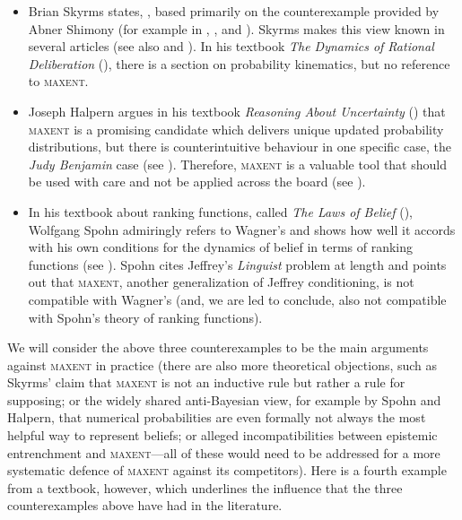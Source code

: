 \documentclass[11pt]{article}
\begin{document}
\begin{itemize}
\item Brian Skyrms states,  , based
  primarily on the counterexample provided by Abner Shimony (for
  example in ,
  , and ). Skyrms
  makes this view known in several articles (see also
   and ). In his
  textbook \emph{The Dynamics of Rational Deliberation}
  (), there is a section on probability
  kinematics, but no reference to \textsc{maxent}.
\item Joseph Halpern argues in his textbook \emph{Reasoning About
    Uncertainty} () that \textsc{maxent} is a
  promising candidate which delivers unique updated probability
  distributions, but there is counterintuitive behaviour in one
  specific case, the \emph{Judy Benjamin} case (see ). Therefore, \textsc{maxent} is a valuable tool that should
  be used with care and not be applied across the board (see
  ).
\item In his textbook about ranking functions, called \emph{The Laws
    of Belief} (), Wolfgang Spohn admiringly
  refers to Wagner's   and shows how well it
  accords with his own conditions for the dynamics of belief in terms
  of ranking functions (see ). Spohn cites
  Jeffrey's \emph{Linguist} problem at length and points out that
  \textsc{maxent}, another generalization of Jeffrey conditioning, is
  not compatible with Wagner's (and, we are led to conclude, also not
  compatible with Spohn's theory of ranking functions).
\end{itemize}

We will consider the above three counterexamples to be the main
arguments against \textsc{maxent} in practice (there are also more
theoretical objections, such as Skyrms' claim that \textsc{maxent} is
not an inductive rule but rather a rule for supposing; or the widely
shared anti-Bayesian view, for example by Spohn and Halpern, that
numerical probabilities are even formally not always the most helpful
way to represent beliefs; or alleged incompatibilities between
epistemic entrenchment and \textsc{maxent}---all of these would need
to be addressed for a more systematic defence of \textsc{maxent}
against its competitors). Here is a fourth example from a textbook,
however, which underlines the influence that the three counterexamples
above have had in the literature. 
\end{document}
